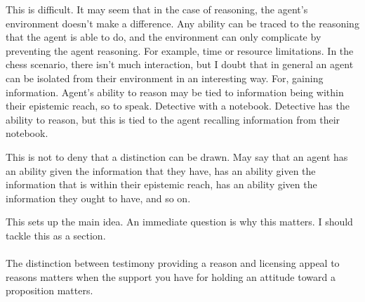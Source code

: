 \documentclass[10pt]{article}
\begin{document}
\begin{note}
  This is difficult.
  It may seem that in the case of reasoning, the agent's environment doesn't make a difference.
  Any ability can be traced to the reasoning that the agent is able to do, and the environment can only complicate by preventing the agent reasoning.
  For example, time or resource limitations.
  In the chess scenario, there isn't much interaction, but I doubt that in general an agent can be isolated from their environment in an interesting way.
  For, gaining information.
  Agent's ability to reason may be tied to information being within their epistemic reach, so to speak.
  Detective with a notebook.
  Detective has the ability to reason, but this is tied to the agent recalling information from their notebook.

  This is not to deny that a distinction can be drawn.
  May say that an agent has an ability given the information that they have, has an ability given the information that is within their epistemic reach, has an ability given the information they ought to have, and so on.
  
\end{note}


\begin{note}
  This sets up the main idea.
  An immediate question is why this matters.
  I should tackle this as a section.
\end{note}






\paragraph{ }
The distinction between testimony providing a reason and licensing appeal to reasons matters when the support you have for holding an attitude toward a proposition matters.
\end{document}
